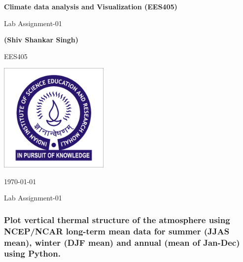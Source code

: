\documentclass[10pt, a4paper]{article}
\newcommand\course{EES405}                            %
\newcommand\hwnumber{Lab Assignment-01}                                 %
\newcommand\Information{(Shiv Shankar Singh)}%
\begin{document}
\begin{titlepage}
    \begin{center}
        \vspace*{3cm}
            
        \Huge
        \textbf{Climate data analysis and Visualization (EES405)}
            
        \vspace{1cm}
        \huge
        \hwnumber
            
        \vspace{1.5cm}
        \Large
            
        \textbf{\Information}                      %
        
            
        \vfill
        
        \course
            
        \vspace{1cm}
            
        \includegraphics[width=0.4\textwidth]{iisermlogo.jpg}
        \\
        
        \Large
        
        \today
            
    \end{center}
\end{titlepage}

\newpage
Lab Assignment-01
\subsubsection*{Plot vertical thermal structure of the atmosphere using NCEP/NCAR long-term mean data for summer (JJAS mean), winter (DJF mean) and annual (mean of Jan-Dec) using Python.}
\end{document}
